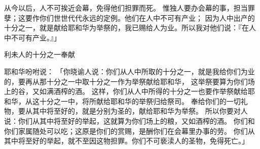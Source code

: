 {从今以后，{}人不可挨近会幕，免得他们担罪而死。
惟独{}人要办会幕的事，担当罪孽；这要作你们世世代代永远的定例。他们在{}人中不可有产业；
因为{}人中出产的十分之一，就是献给耶和华为举祭的，我已赐给{}人为业。所以我对他们说：『在{}人中不可有产业。』」
\par }{\SH 利未人的十分之一奉献
\par }{\PP {}耶和华吩咐{}说：
「你晓谕{}人说：你们从{}人中所取的十分之一，就是我给你们为业的，要再从那十分之一中取十分之一作为举祭献给耶和华，
这举祭要算为你们场上的谷，又如满酒榨的酒。
这样，你们从{}人中所得的十分之一也要作举祭献给耶和华，从这十分之一中，将所献给耶和华的举祭归给祭司{}。
奉给你们的一切礼物，要从其中将至好的，就是分别为圣的，献给耶和华为举祭。
所以你要对{}人说：你们从其中将至好的举起，这就算为你们场上的粮，又如酒榨的酒。
你们和你们家属随处可以吃；这原是你们的赏赐，是酬你们在会幕里办事的劳。
你们从其中将至好的举起，就不至因这物担罪。你们不可亵渎{}人的圣物，免得死亡。」

}
